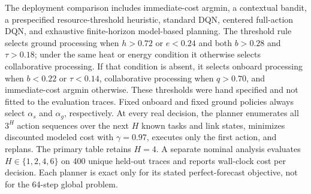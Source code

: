 \documentclass[11pt]{article}
\newcommand{\method}{centered full-action DQN\xspace}
\begin{document}
\color{red}%
The deployment comparison includes immediate-cost argmin, a contextual bandit, a prespecified resource-threshold heuristic, standard DQN, \method, and exhaustive finite-horizon model-based planning. The threshold rule selects ground processing when $h>0.72$ or $e<0.24$ and both $b>0.28$ and $\tau>0.18$; under the same heat or energy condition it otherwise selects collaborative processing. If that condition is absent, it selects onboard processing when $b<0.22$ or $\tau<0.14$, collaborative processing when $q>0.70$, and immediate-cost argmin otherwise. These thresholds were hand specified and not fitted to the evaluation traces. Fixed onboard and fixed ground policies always select $\alpha_s$ and $\alpha_g$, respectively. At every real decision, the planner enumerates all $3^H$ action sequences over the next $H$ known tasks and link states, minimizes discounted modeled cost with $\gamma=0.97$, executes only the first action, and replans. The primary table retains $H=4$. A separate nominal analysis evaluates $H\in\{1,2,4,6\}$ on 400 unique held-out traces and reports wall-clock cost per decision. Each planner is exact only for its stated perfect-forecast objective, not for the 64-step global problem.
\color{black}%
\end{document}
